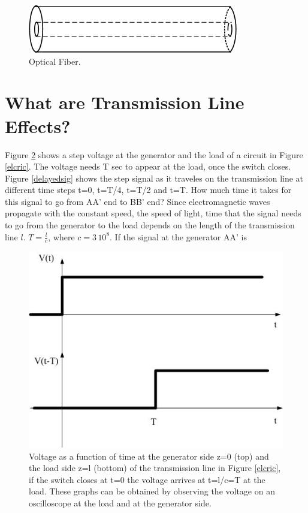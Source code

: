 \documentclass{ximera}
\begin{document}
\begin{figure}[ht!]
\begin{center}
\includegraphics[scale=0.4]{../jpg/fiber.jpg}
\caption{\label{fig:qm/OF} Optical Fiber.}
\end{center}
\end{figure}


\section{What are Transmission Line Effects?}

Figure \ref{timedelaysig} shows a step voltage at the generator and the load of a circuit in Figure \ref{elcric}. The voltage needs T sec to appear at the load, once the switch closes. Figure \ref{delayedsig} shows the step signal as it traveles on the transmission line at different time steps t=0, t=T/4, t=T/2 and t=T.
How much time it takes for this signal to go from AA' end to BB' end? 
Since electromagnetic waves propagate with the constant speed, the speed of light, time that  the signal needs to go from the generator to  the load  depends  on the length of the transmission line $ l$.  $T=\frac{l}{c}$, where $c=3\, 10^8$. If the signal at the generator AA' is


\begin{figure}[htbp]
\begin{center}
\includegraphics[scale=0.5]{../jpg/timedelayedsignal.jpg}  
\end{center}
\caption{Voltage as a function of time at the generator side z=0 (top) and the load side z=l (bottom) of the transmission line in Figure \ref{elcric}, if the switch closes at t=0 the voltage arrives at t=l/c=T at the load. These graphs can be obtained by observing the voltage on an oscilloscope at the load and at the generator side.}
\label{timedelaysig}  \end{figure}
\end{document}

